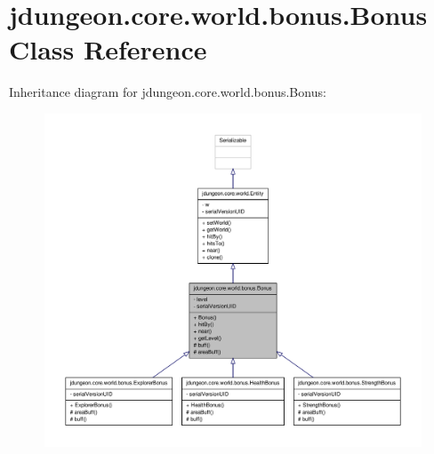 \hypertarget{classjdungeon_1_1core_1_1world_1_1bonus_1_1_bonus}{
\section{jdungeon.core.world.bonus.Bonus Class Reference}
\label{classjdungeon_1_1core_1_1world_1_1bonus_1_1_bonus}
}


Inheritance diagram for jdungeon.core.world.bonus.Bonus:
\nopagebreak
\begin{figure}[H]
\begin{center}
\leavevmode
\includegraphics[width=400pt]{classjdungeon_1_1core_1_1world_1_1bonus_1_1_bonus__inherit__graph}
\end{center}
\end{figure}



